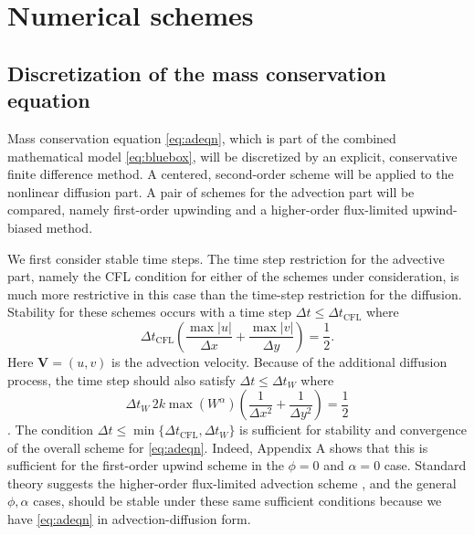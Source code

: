 \documentclass[11pt,final]{amsart}
\newcommand\bV{\mathbf{V}}
\begin{document}
\section{Numerical schemes}  \label{sec:num}

\subsection*{Discretization of the mass conservation equation}  Mass conservation equation \eqref{eq:adeqn}, which is part of the combined mathematical model \eqref{eq:bluebox}, will be discretized by an explicit, conservative finite difference method.   A centered, second-order scheme will be applied to the nonlinear diffusion part.  A pair of schemes for the advection part will be compared, namely first-order upwinding and a higher-order flux-limited upwind-biased method.

We first consider stable time steps.  The time step restriction for the advective part, namely the CFL condition for either of the schemes under consideration, is much more restrictive in this case than the time-step restriction for the diffusion.  Stability for these schemes occurs with a time step $\Delta t \le \Delta t_{\text{CFL}}$ where
\begin{equation}
\Delta t_{\text{CFL}} \left(\frac{\max |u|}{\Delta x} + \frac{\max |v|}{\Delta y}\right) = \frac{1}{2}. \label{eq:dtCFL}
\end{equation}
Here $\bV=(u,v)$ is the advection velocity.  Because of the additional diffusion process, the time step should also satisfy $\Delta t \le \Delta t_{W}$  where
\begin{equation}
\Delta t_W\, 2 k \max(W^\alpha) \left(\frac{1}{\Delta x^2} + \frac{1}{\Delta y^2}\right) = \frac{1}{2} \label{eq:dtDIFFW}
\end{equation}
\citep{MortonMayers}.  The condition $\Delta t \le \min\{\Delta t_{\text{CFL}}, \Delta t_W\}$ is sufficient for stability and convergence of the overall scheme for \eqref{eq:adeqn}.  Indeed, Appendix A shows that this is sufficient for the first-order upwind scheme in the $\phi=0$ and $\alpha = 0$ case.  Standard theory suggests the higher-order flux-limited advection scheme \citep{HundsdorferVerwer2010}, and the general $\phi,\alpha$ cases, should be stable under these same sufficient conditions because we have \eqref{eq:adeqn} in advection-diffusion form.
\end{document}
